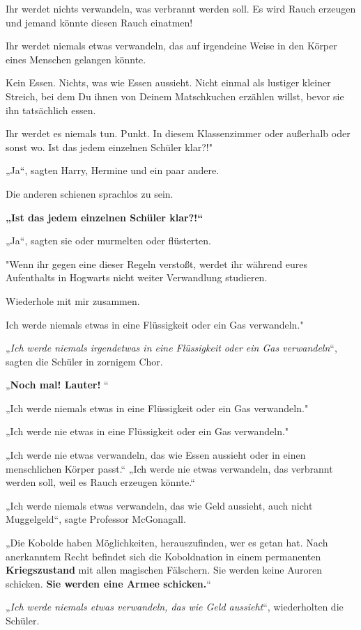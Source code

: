{Ihr werdet nichts verwandeln, was verbrannt werden soll. Es wird Rauch erzeugen und jemand könnte diesen Rauch einatmen!

Ihr werdet niemals etwas verwandeln, das auf irgendeine Weise in den Körper eines Menschen gelangen könnte.

Kein Essen. Nichts, was wie Essen aussieht. Nicht einmal als lustiger kleiner Streich, bei dem Du ihnen von Deinem Matschkuchen erzählen willst, bevor sie ihn tatsächlich essen.

Ihr werdet es niemals tun. Punkt. In diesem Klassenzimmer oder außerhalb oder sonst wo. Ist das jedem einzelnen Schüler klar?!"

„Ja“, sagten Harry, Hermine und ein paar andere.

Die anderen schienen sprachlos zu sein.

\textbf{„Ist das jedem einzelnen Schüler klar?!“}

„Ja“, sagten sie oder murmelten oder flüsterten.

"Wenn ihr gegen eine dieser Regeln verstoßt, werdet ihr während eures Aufenthalts in Hogwarts nicht weiter Verwandlung studieren.

Wiederhole mit mir zusammen.

Ich werde niemals etwas in eine Flüssigkeit oder ein Gas verwandeln."

„\emph{Ich werde niemals irgendetwas in eine Flüssigkeit oder ein Gas verwandeln}“, sagten die Schüler in zornigem Chor.

„\textbf{Noch mal! Lauter!} “

„Ich werde niemals etwas in eine Flüssigkeit oder ein Gas verwandeln."

„Ich werde nie etwas in eine Flüssigkeit oder ein Gas verwandeln."

„Ich werde nie etwas verwandeln, das wie Essen aussieht oder in einen menschlichen Körper passt.“ „Ich werde nie etwas verwandeln, das verbrannt werden soll, weil es Rauch erzeugen könnte.“

„Ich werde niemals etwas verwandeln, das wie Geld aussieht, auch nicht Muggelgeld“, sagte Professor McGonagall.

„Die Kobolde haben Möglichkeiten, herauszufinden, wer es getan hat. Nach anerkanntem Recht befindet sich die Koboldnation in einem permanenten \textbf{Kriegszustand} mit allen magischen Fälschern. Sie werden keine Auroren schicken. \textbf{Sie werden eine Armee schicken.}“

„\emph{Ich werde niemals etwas verwandeln, das wie Geld aussieht}“, wiederholten die Schüler.

}

